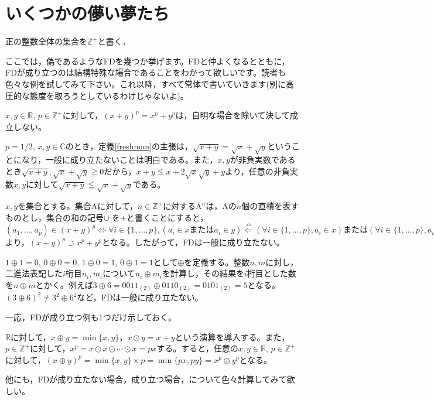 \section{いくつかの儚い夢たち}
\begin{dfn}[数の集合]
  正の整数全体の集合を$\mathbb{Z^{+}}$と書く．
\end{dfn}

ここでは，偽であるような\textsf{FD}を幾つか挙げます。\textsf{FD}と仲よくなるとともに，\textsf{FD}が成り立つのは結構特殊な場合であることをわかって欲しいです。読者も色々な例を試してみて下さい。これ以降，すべて常体で書いていきます(別に高圧的な態度を取ろうとしているわけじゃないよ)。

\begin{mybox}[展開公式]
  $x,y \in \mathbb{R},\, p \in \mathbb{Z^{+}}$に対して，$(x + y)^p = x^p + y^p$は，自明な場合を除いて決して成立しない。
\end{mybox}

\begin{mybox}[平方根]
  $p = 1/2, \, x,y \in \mathbb{C}$のとき，定義\ref{freshman}の主張は，$\sqrt{x+y} = \sqrt{x} + \sqrt{y}$ということになり，一般に成り立たないことは明白である。また，$x,y$が非負実数であるとき$\sqrt{x+y},\sqrt{x}+\sqrt{y}\geqq 0$だから，$x+y\leqq x+2\sqrt{x}\sqrt{y}+y$より，任意の非負実数$x,y$に対して$\sqrt{x+y}\leqq\sqrt{x}+\sqrt{y}$である。
\end{mybox}

\begin{mybox}[集合の直積]
  $x,y$を集合とする。集合$\mathrm{A}$に対して，$n \in \mathbb{Z^{+}}$に対する$\mathrm{A}^n$は，$\mathrm{A}$の$n$個の直積を表すものとし，集合の和の記号$\cup$ を+と書くことにすると，$(a_1,\ldots,a_p)\in(x+y)^p\Leftrightarrow\forall i\in\{1,\ldots,p\},(a_i\in x\text{または} a_i\in y)\overset{\not\Rightarrow}{\Leftarrow}(\forall i\in\{1,\ldots,p\}, a_i\in x)\text{または}(\forall i\in\{1,\ldots,p\}, a_i\in y)\Leftrightarrow (a_1,\ldots,a_p)\in x^p+y^p$より，$(x+y)^p\supset x^p+y^p$となる。したがって，\textsf{FD}は一般に成り立たない。
\end{mybox}

\begin{mybox}[排他的論理和]
  $1\oplus1=0,\,0\oplus0=0,\,1\oplus0=1,\,0\oplus1=1$として$\oplus$を定義する。整数$n,m$に対し，二進法表記した$i$桁目$n_i,m_i$について$n_i\oplus m_i$を計算し，その結果を$i$桁目とした数を$n\oplus m$とかく。例えば$3\oplus6=0011_{(2)}\oplus0110_{(2)}=0101_{(2)}=5$となる。$(3\oplus6)^2\ne 3^2\oplus6^2$など，\textsf{FD}は一般に成り立たない。
\end{mybox}

一応，\textsf{FD}が成り立つ例も1つだけ示しておく。

\begin{mybox}
  $\mathbb{R}$に対して，$x\oplus y=\min\{x, y\}$，$x\odot y=x+y$という演算を導入する。また，$p\in\mathbb{Z^+}$に対して，$x^p=x\odot x\odot\cdots\odot x=px$する。すると，任意の$x,y\in\mathbb{R},\, p\in\mathbb{Z}^+$に対して，$(x\oplus y)^p=\min\{x,y\}\times p=\min\{px, py\}=x^p\oplus y^p$となる。
\end{mybox}

他にも，\textsf{FD}が成り立たない場合，成り立つ場合，について色々計算してみて欲しい。


